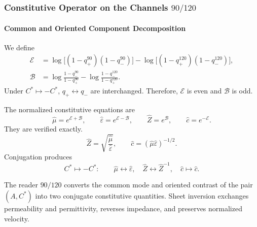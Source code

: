 \subsubsection{Constitutive Operator on the Channels \(90/120\)}

\paragraph{Common and Oriented Component Decomposition}

We define
\begin{align}
\mathcal E
&=\log\bigl[(1-q_+^{90})(1-q_-^{90})\bigr]
-\log\bigl[(1-q_+^{120})(1-q_-^{120})\bigr],
\label{eq:Ecommon}\\
\mathcal B
&=\log\frac{1-q_-^{90}}{1-q_+^{90}}
-\log\frac{1-q_-^{120}}{1-q_+^{120}}.
\label{eq:Borient}
\end{align}
Under \(C^*\mapsto-C^*\), \(q_+\leftrightarrow q_-\) are interchanged. Therefore,
\(\mathcal E\) is even and \(\mathcal B\) is odd.

The normalized constitutive equations are
\begin{equation}
\widehat\mu=e^{\mathcal E+\mathcal B},
\qquad
\widehat\varepsilon=e^{\mathcal E-\mathcal B},
\qquad
\widehat Z=e^{\mathcal B},
\qquad
\widehat c=e^{-\mathcal E}.
\label{eq:constitutives}
\end{equation}
They are verified exactly.
\begin{equation}
\widehat Z=\sqrt{\frac{\widehat\mu}{\widehat\varepsilon}},
\qquad
\widehat c=(\widehat\mu\widehat\varepsilon)^{-1/2}.
\label{eq:constitutive-identities}
\end{equation}
Conjugation produces
\begin{equation}
C^*\mapsto-C^*:\qquad
\widehat\mu\leftrightarrow\widehat\varepsilon,
\quad
\widehat Z\leftrightarrow\widehat Z^{-1},
\quad
\widehat c\mapsto\widehat c.
\label{eq:EM-conjugation}
\end{equation}

\begin{theorem}
The reader \(90/120\) converts the common mode and oriented contrast of the
pair \((A,C^*)\) into two conjugate constitutive quantities. Sheet inversion
exchanges permeability and permittivity, reverses impedance, and preserves normalized
velocity.
\end{theorem}

